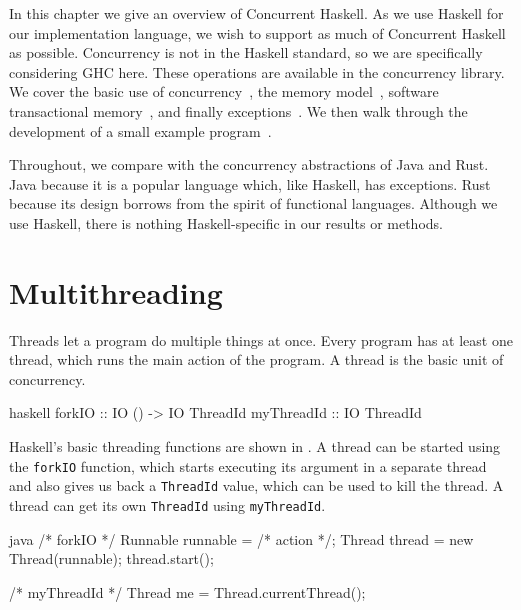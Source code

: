 In this chapter we give an overview of Concurrent
Haskell\cite{peytonjones1996,peytonjones2005}.  As we use Haskell for
our implementation language, we wish to support as much of Concurrent
Haskell as possible.  Concurrency is not in the Haskell standard, so
we are specifically considering GHC here.  These operations are
available in the concurrency\cite{concurrency} library.  We cover the
basic use of concurrency~, the memory
model~, software transactional
memory~, and finally
exceptions~.  We then walk through the
development of a small example
program~.

Throughout, we compare with the concurrency abstractions of
Java\cite{lea1996} and Rust\cite{rust2011}.  Java because it is a
popular language which, like Haskell, has exceptions.  Rust because
its design borrows from the spirit of functional languages.  Although
we use Haskell, there is nothing Haskell-specific in our results or
methods.

\section{Multithreading}
\label{sec:concurrent_haskell-threads}

Threads let a program do multiple things at once.  Every program has
at least one thread, which runs the main action of the program.  A
thread is the basic unit of concurrency.

\begin{listing}
\centering
\begin{cminted}{haskell}
forkIO     :: IO () -> IO ThreadId
myThreadId :: IO ThreadId
\end{cminted}
\caption{Basic threading operations in Haskell.}\label{lst:basic_haskell}
\end{listing}

Haskell's basic threading functions are shown in
.  A thread can be started using the
\verb|forkIO| function, which starts executing its argument in a
separate thread and also gives us back a \verb|ThreadId| value, which
can be used to kill the thread.  A thread can get its own
\verb|ThreadId| using \verb|myThreadId|.

\begin{listing}
\centering
\begin{cminted}{java}
/* forkIO */
Runnable runnable = /* action */;
Thread thread = new Thread(runnable);
thread.start();

/* myThreadId */
Thread me = Thread.currentThread();
\end{cminted}
\caption{Basic threading operations in Java.}\label{lst:basic_java}
\end{listing}

